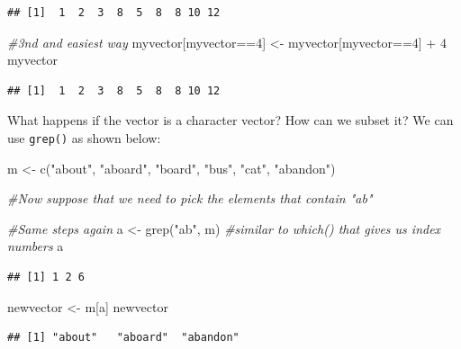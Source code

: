 \documentclass[
]{book}
\newenvironment{Shaded}{\begin{snugshade}}{\end{snugshade}}
\newcommand{\CommentTok}[1]{\textcolor[rgb]{0.56,0.35,0.01}{\textit{#1}}}
\newcommand{\DecValTok}[1]{\textcolor[rgb]{0.00,0.00,0.81}{#1}}
\newcommand{\FunctionTok}[1]{\textcolor[rgb]{0.00,0.00,0.00}{#1}}
\newcommand{\NormalTok}[1]{#1}
\newcommand{\OtherTok}[1]{\textcolor[rgb]{0.56,0.35,0.01}{#1}}
\newcommand{\SpecialCharTok}[1]{\textcolor[rgb]{0.00,0.00,0.00}{#1}}
\newcommand{\StringTok}[1]{\textcolor[rgb]{0.31,0.60,0.02}{#1}}
\theoremstyle{definition}
\theoremstyle{definition}
\theoremstyle{definition}
\theoremstyle{definition}
\theoremstyle{remark}
\begin{document}
\begin{verbatim}
## [1]  1  2  3  8  5  8  8 10 12
\end{verbatim}

\begin{Shaded}
\begin{Highlighting}[]
\CommentTok{\#3nd and easiest way}
\NormalTok{myvector[myvector}\SpecialCharTok{==}\DecValTok{4}\NormalTok{] }\OtherTok{\textless{}{-}}\NormalTok{ myvector[myvector}\SpecialCharTok{==}\DecValTok{4}\NormalTok{] }\SpecialCharTok{+} \DecValTok{4}
\NormalTok{myvector}
\end{Highlighting}
\end{Shaded}

\begin{verbatim}
## [1]  1  2  3  8  5  8  8 10 12
\end{verbatim}

What happens if the vector is a character vector? How can we subset it? We can use \texttt{grep()} as shown below:

\begin{Shaded}
\begin{Highlighting}[]
\NormalTok{m }\OtherTok{\textless{}{-}} \FunctionTok{c}\NormalTok{(}\StringTok{"about"}\NormalTok{, }\StringTok{"aboard"}\NormalTok{, }\StringTok{"board"}\NormalTok{, }\StringTok{"bus"}\NormalTok{, }\StringTok{"cat"}\NormalTok{, }\StringTok{"abandon"}\NormalTok{)}

\CommentTok{\#Now suppose that we need to pick the elements that contain "ab"}

\CommentTok{\#Same steps again}
\NormalTok{a }\OtherTok{\textless{}{-}} \FunctionTok{grep}\NormalTok{(}\StringTok{"ab"}\NormalTok{, m) }\CommentTok{\#similar to which() that gives us index numbers}
\NormalTok{a}
\end{Highlighting}
\end{Shaded}

\begin{verbatim}
## [1] 1 2 6
\end{verbatim}

\begin{Shaded}
\begin{Highlighting}[]
\NormalTok{newvector }\OtherTok{\textless{}{-}}\NormalTok{ m[a]}
\NormalTok{newvector}
\end{Highlighting}
\end{Shaded}

\begin{verbatim}
## [1] "about"   "aboard"  "abandon"
\end{verbatim}
\end{document}
